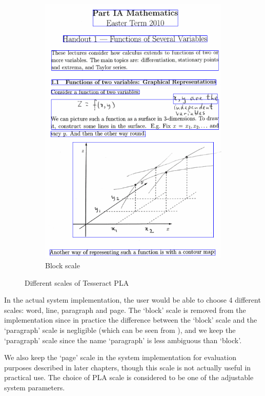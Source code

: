 \begin{figure}[!ht]
\begin{subfigure}{.42\textwidth}
    \includegraphics[width=\textwidth]{pla-block.png}
    \caption{Block scale}
  \end{subfigure}
  \caption{Different scales of Tesseract PLA}
  \label{fig:tess-pla-scales}
\end{figure}

In the actual system implementation, the user would be able to choose 4 different scales: word, line, paragraph and page. The `block' scale is removed from the implementation since in practice the difference between the `block' scale and the `paragraph' scale is negligible (which can be seen from ), and we keep the `paragraph' scale since the name `paragraph' is less ambiguous than `block'. 

We also keep the `page' scale in the system implementation for evaluation purposes described in later chapters, though this scale is not actually useful in practical use. The choice of PLA scale is considered to be one of the adjustable system parameters.

